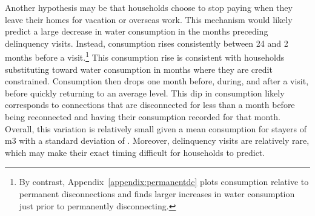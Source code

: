 \documentclass[12pt]{article}
\begin{document}
Another hypothesis may be that households choose to stop paying when they leave their homes for vacation or overseas work.  This mechanism would likely predict a large decrease in water consumption in the months preceding delinquency visits.  Instead, consumption rises consistently between 24 and 2 months before a visit.\footnote{By contrast, Appendix~\ref{appendix:permanentdc} plots consumption relative to permanent disconnections and finds larger increases in water consumption just prior to permanently disconnecting.}  This consumption rise is consistent with households substituting toward water consumption in months where they are credit constrained.  Consumption then drops one month before, during, and after a visit, before quickly returning to an average level.  This dip in consumption likely corresponds to connections that are disconnected for less than a month before being reconnected and having their consumption recorded for that month.  Overall, this variation is relatively small given a mean consumption for stayers of m3 with a standard deviation of \unskip.  Moreover, delinquency visits are relatively rare, which may make their exact timing difficult for households to predict.  















\end{document}
